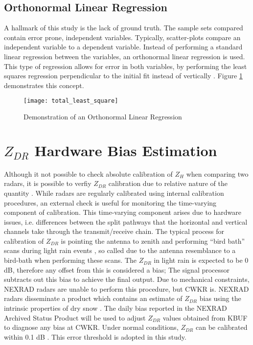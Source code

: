\subsection{Orthonormal Linear Regression}
A hallmark of this study is the lack of ground truth. The sample sets compared contain error prone, independent variables. Typically, scatter-plots compare
an independent variable to a dependent variable. Instead of performing a standard linear regression between the variables, an orthonormal linear regression
is used. This type of regression allows for error in both variables, by performing the least squares regression perpendicular to the initial fit instead of
vertically \citep{Markovsky2007}. Figure \ref{fig:total_least_squares} demonstrates this concept.
\begin{figure}[H]
\texttt{[image: total\_least\_square]}\centering
\caption{Demonstration of an Orthonormal Linear Regression} 
\label{fig:total_least_squares}
\end{figure}
\section{$Z_{DR}$ Hardware Bias Estimation}
Although it not possible to check absolute calibration of $Z_{H}$ when comparing two radars, it is possible to verfiy $Z_{DR}$ calibration due to relative
nature of the quantity \citep{Zrnic2006}. While radars are regularly calibrated using internal calibration procedures, an external check is useful for
monitoring the time-varying component of calibration. This time-varying component arises due to hardware issues, i.e. differences between the split pathways that the horizontal and vertical channels take through the transmit/receive chain. The typical process for calibration of $Z_{DR}$ is pointing the antenna to zenith and performing ``bird
bath'' scans during light rain events \citep{Hubbert2006}, so called due to the antenna resemblance to a bird-bath when performing these scans. The $Z_{DR}$ in light rain is expected to be 0 dB, therefore any offset from this is considered a
bias; The signal processor subtracts out this bias to achieve the final output. Due to mechanical constraints, NEXRAD radars are unable to perform this
procedure, but CWKR is. NEXRAD radars disseminate a product which contains an estimate of $Z_{DR}$ bias using the intrinsic properties of
dry snow \cite{Zittel2015}. The daily bias reported in the NEXRAD Archived Status Product will be used to adjust $Z_{DR}$ values obtained from KBUF to diagnose any bias at CWKR. Under normal conditions, $Z_{DR}$ can be calibrated within 0.1 dB \citep{Zrnic2006}. This error threshold is adopted in this study.
